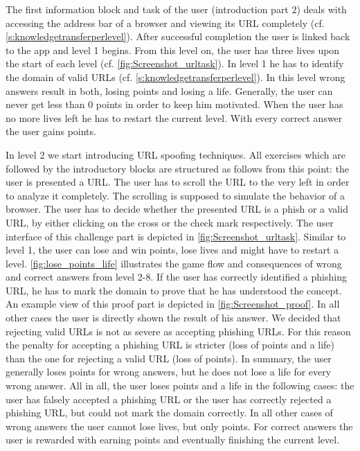 \begin{description}[leftmargin=0cm]
	\item[Obtaining Basic Knowledge:]  
The first information block and task of the user (introduction part 2) deals with accessing the address bar of a browser and viewing its URL completely (cf. \autoref{s:knowledgetransferperlevel}).
 After successful completion the user is linked back to the app and level 1 begins.
 From this level on, the user has three lives upon the start of each level (cf. \autoref{fig:Screenshot_urltask}).
 In level 1 he has to identify the domain of valid URLs (cf. \autoref{s:knowledgetransferperlevel}).
 In this level wrong answers result in both, losing points and losing a life.
 Generally, the user can never get less than 0 points in order to keep him motivated.
 When the user has no more lives left he has to restart the current level.
 With every correct answer the user gains points.
	\item[The Actual Game:]  In level 2 we start introducing URL spoofing techniques. 
All exercises which are followed by the introductory blocks are structured as follows from this point: the user is presented a URL.
The user has to scroll the URL to the very left in order to analyze it completely.
The scrolling is supposed to simulate the behavior of a browser.
The user has to decide whether the presented URL is a phish or a valid URL, by either clicking on the cross or the check mark respectively.
The user interface of this challenge part is depicted in \autoref{fig:Screenshot_urltask}.
 Similar to level 1, the user can lose and win points, lose lives and might have to restart a level.
\autoref{fig:lose_points_life} illustrates the game flow and consequences of wrong and correct answers from level 2-8.
 If the user has correctly identified a phishing URL, he has to mark the domain to prove that he has understood the concept.
An example view of this proof part is depicted in \autoref{fig:Screenshot_proof}.
 In all other cases the user is directly shown the result of his answer.
 We decided that rejecting valid URLs is not as severe as accepting phishing URLs.
 For this reason the penalty for accepting a phishing URL is stricter (loss of points and a life) than the one for rejecting a valid URL (loss of points).
 In summary, the user generally loses points for wrong answers, but he does not lose a life for every wrong answer.
 All in all, the user loses points and a life in the following cases: the user has falsely accepted a phishing URL or the user has correctly rejected a phishing URL, but could not mark the domain correctly. In all other cases of wrong answers the user cannot lose lives, but only points.
For correct answers the user is rewarded with earning points and eventually finishing the current level.
\end{description}


